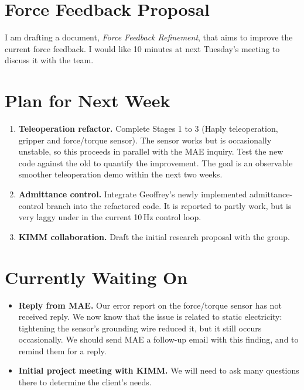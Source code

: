 \documentclass[11pt]{article}
\begin{document}
\section{Force Feedback Proposal}

I am drafting a document, \emph{Force Feedback Refinement}, that aims to improve the current force feedback.
I would like 10 minutes at next Tuesday's meeting to discuss it with the team.

\section{Plan for Next Week}

\begin{enumerate}
    \item \textbf{Teleoperation refactor.} Complete Stages 1 to 3 (Haply teleoperation, gripper and
    force\slash torque sensor). The sensor works but is occasionally unstable, so this proceeds in parallel with
    the MAE inquiry. Test the new code against the old to quantify the improvement. The goal is an observable smoother
    teleoperation demo within the next two weeks.

    \item \textbf{Admittance control.} Integrate Geoffrey's newly implemented admittance-control branch into
    the refactored code. It is reported to partly work, but is very laggy under in the current
    10\,Hz control loop.

    \item \textbf{KIMM collaboration.} Draft the initial research proposal with the group.
\end{enumerate}

\section{Currently Waiting On}

\begin{itemize}
    \item \textbf{Reply from MAE.} Our error report on the force\slash torque sensor has not received reply.
    We now know that the issue is related to static electricity: tightening the sensor's grounding
    wire reduced it, but it still occurs occasionally. We should send MAE a follow-up email with this finding, and to remind them for a reply.

    \item \textbf{Initial project meeting with KIMM.} We will need to ask many questions there to determine the client's needs.
\end{itemize}
\end{document}
